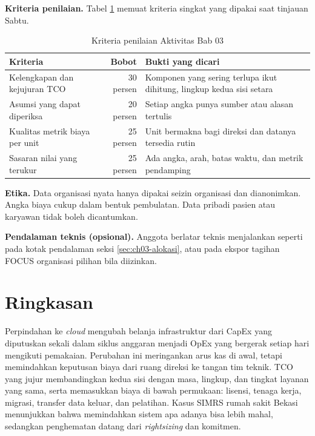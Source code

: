 \textbf{Kriteria penilaian.} Tabel \ref{tab:ch03-kriteria-aktivitas} memuat kriteria singkat yang
dipakai saat tinjauan Sabtu.

\begin{table}[!htb]
  \centering
  \caption{Kriteria penilaian Aktivitas Bab 03}
  \label{tab:ch03-kriteria-aktivitas}
  \footnotesize
  \begin{tabularx}{\textwidth}{>{\raggedright\arraybackslash}X r >{\raggedright\arraybackslash}X}
    \hline
    \textbf{Kriteria} & \textbf{Bobot} & \textbf{Bukti yang dicari} \\ \hline
    Kelengkapan dan kejujuran TCO & 30 persen & Komponen yang sering terlupa ikut dihitung, lingkup
      kedua sisi setara \\ \hline
    Asumsi yang dapat diperiksa & 20 persen & Setiap angka punya sumber atau alasan tertulis \\
      \hline
    Kualitas metrik biaya per unit & 25 persen & Unit bermakna bagi direksi dan datanya tersedia
      rutin \\ \hline
    Sasaran nilai yang terukur & 25 persen & Ada angka, arah, batas waktu, dan metrik pendamping \\
      \hline
  \end{tabularx}
\end{table}

\textbf{Etika.} Data organisasi nyata hanya dipakai seizin organisasi dan dianonimkan. Angka biaya
cukup dalam bentuk pembulatan. Data pribadi pasien atau karyawan tidak boleh dicantumkan.

\textbf{Pendalaman teknis (opsional).} Anggota berlatar teknis menjalankan
 seperti pada kotak pendalaman seksi
\ref{sec:ch03-alokasi}, atau pada ekspor tagihan FOCUS organisasi pilihan bila diizinkan.

\section{Ringkasan}

Perpindahan ke \textit{cloud} mengubah belanja infrastruktur dari CapEx yang diputuskan sekali dalam
siklus anggaran menjadi OpEx yang bergerak setiap hari mengikuti pemakaian. Perubahan ini
meringankan arus kas di awal, tetapi memindahkan keputusan biaya dari ruang direksi ke tangan tim
teknik. TCO yang jujur membandingkan kedua sisi dengan masa, lingkup, dan tingkat layanan yang sama,
serta memasukkan biaya di bawah permukaan: lisensi, tenaga kerja, migrasi, transfer data keluar, dan
pelatihan. Kasus SIMRS rumah sakit Bekasi menunjukkan bahwa memindahkan sistem apa adanya bisa lebih
mahal, sedangkan penghematan datang dari \textit{rightsizing} dan komitmen.

